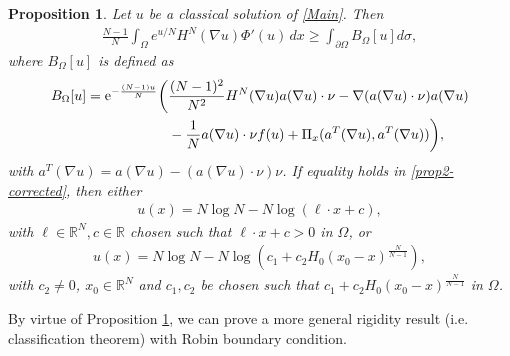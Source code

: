 \documentclass[reqno, 11pt]{amsart} %
\numberwithin{equation}{section}
\newtheorem{prop}[thm]{Proposition}
\theoremstyle{definition}
\newcommand{\R}{\mathbb{R}}
\newcommand{\e}{\textup{e}}
\newcommand{\calR}{\mathcal{R}}
\begin{document}
\begin{prop}\label{Prop2}
Let $u$ be a classical solution of \eqref{Main}. Then
\begin{align}\label{prop2-corrected}
        \frac{N-1}{N}\int_{\Omega}e^{u/N}H^N(\nabla u)\Phi'(u)\,dx
        \ge \int_{\partial\Omega}B_\Omega[u]d\sigma,
\end{align}
where $B_\Omega[u]$ is defined as
\begin{align}\label{eq:BOmega}
    B_{\Omega}[u] = \e^{-\frac{(N-1)u}{N}} \bigg( & \frac{(N-1)^2}{N^2} H^N(\nabla u) a(\nabla u) \cdot \nu - \nabla (a(\nabla u) \cdot \nu) a(\nabla u ) \nonumber \\
    & - \frac{1}{N} a(\nabla u) \cdot \nu f(u) + \Pi_x(a^T(\nabla u), a^T(\nabla u) ) \bigg),
\end{align}
with $a^T(\nabla u) = a(\nabla u) - (a(\nabla u) \cdot  \nu) \nu$.
If equality holds in \eqref{prop2-corrected}, then either
    \begin{align}\label{affine}
        u(x) = N \log N - N \log (\ell \cdot x + c),
    \end{align}
    with $\ell \in \R^N, c \in \R$ chosen such that $\ell \cdot x + c > 0 $ in $\Omega$, or
    \begin{align}\label{bubble-form-intro}
        u(x) = N \log N - N \log (c_1 + c_2 H_0(x_0-x)^{\frac{N}{N-1}}),
    \end{align}
    with $c_2 \neq 0$, $x_0 \in \R^N$ and $c_1, c_2$ be chosen such that $c_1 + c_2 H_0(x_0-x)^{\frac{N}{N-1}} $ in $\Omega$.
\end{prop}

By virtue of Proposition \ref{Prop2}, we can prove a more general rigidity result (i.e.  classification theorem) with Robin boundary condition.
\end{document}
